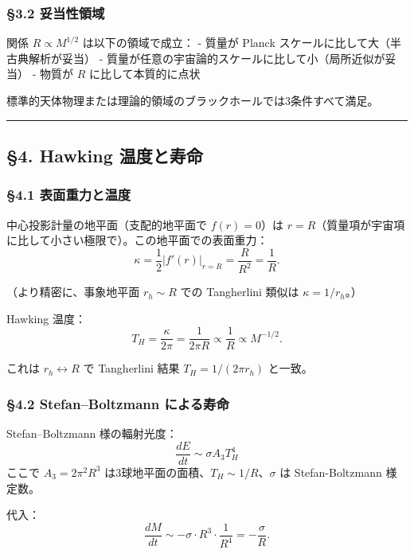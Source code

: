 \documentclass[a4paper,11pt]{ltjsarticle}
\theoremstyle{definition}
\begin{document}
\subsubsection{§3.2 妥当性領域}\label{ux59a5ux5f53ux6027ux9818ux57df}

関係 \(R \propto M^{1/2}\) は以下の領域で成立： - 質量が Planck
スケールに比して大（半古典解析が妥当） -
質量が任意の宇宙論的スケールに比して小（局所近似が妥当） - 物質が \(R\)
に比して本質的に点状

標準的天体物理または理論的領域のブラックホールでは3条件すべて満足。

\begin{center}\rule{0.5\linewidth}{0.5pt}\end{center}

\subsection{§4. Hawking
温度と寿命}\label{hawking-ux6e29ux5ea6ux3068ux5bffux547d}

\subsubsection{§4.1
表面重力と温度}\label{ux8868ux9762ux91cdux529bux3068ux6e29ux5ea6}

中心投影計量の地平面（支配的地平面で \(f(r) = 0\)）は
\(r = R\)（質量項が宇宙項に比して小さい極限で）。この地平面での表面重力：
\[\kappa = \frac{1}{2} |f'(r)|_{r=R} = \frac{R}{R^2} = \frac{1}{R}.\]

（より精密に、事象地平面 \(r_h \sim R\) での Tangherlini 類似は
\(\kappa = 1/r_h\)。）

Hawking 温度：
\[T_H = \frac{\kappa}{2\pi} = \frac{1}{2\pi R} \propto \frac{1}{R} \propto M^{-1/2}.\]

これは \(r_h \leftrightarrow R\) で Tangherlini 結果
\(T_H = 1/(2\pi r_h)\) と一致。

\subsubsection{§4.2 Stefan--Boltzmann
による寿命}\label{stefanboltzmann-ux306bux3088ux308bux5bffux547d}

Stefan--Boltzmann 様の輻射光度： \[\frac{dE}{dt} \sim \sigma A_3 T_H^4\]
ここで \(A_3 = 2\pi^2 R^3\)
は3球地平面の面積、\(T_H \sim 1/R\)、\(\sigma\) は Stefan-Boltzmann
様定数。

代入：
\[\frac{dM}{dt} \sim -\sigma \cdot R^3 \cdot \frac{1}{R^4} = -\frac{\sigma}{R}.\]
\end{document}
